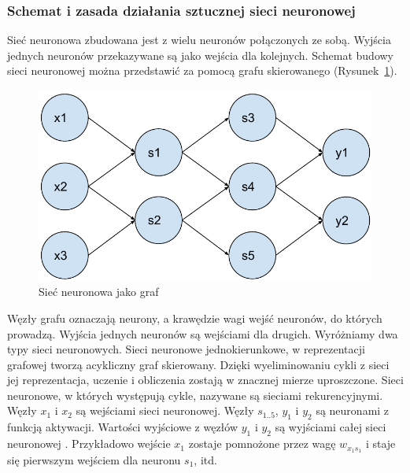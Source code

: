 \documentclass[a4paper,12pt,twoside,openany]{report}
\newcommand{\Rys}[1]{(Rysunek~\ref{#1})}
\begin{document}
\subsubsection{Schemat i zasada działania sztucznej sieci neuronowej}
Sieć neuronowa zbudowana jest z wielu neuronów połączonych ze sobą.
Wyjścia jednych neuronów przekazywane są jako wejścia dla kolejnych.
Schemat budowy sieci neuronowej można przedstawić za pomocą grafu skierowanego \Rys{rys:mlp:graf}.
\begin{figure}[h]
	\centering
	\includegraphics[width=\textwidth]{ann-graf}
	\caption{Sieć neuronowa jako graf}
	\label{rys:mlp:graf}
\end{figure}
Węzły grafu oznaczają neurony, a krawędzie wagi wejść neuronów, do których prowadzą.
Wyjścia jednych neuronów są wejściami dla drugich.
Wyróżniamy dwa typy sieci neuronowych.
Sieci neuronowe jednokierunkowe, w reprezentacji grafowej tworzą acykliczny graf skierowany.
Dzięki wyeliminowaniu cykli z sieci jej reprezentacja, uczenie i obliczenia zostają w znacznej mierze uproszczone. 
Sieci neuronowe, w których występują cykle, nazywane są sieciami rekurencyjnymi.
Węzły $x_1$ i $x_2$ są wejściami sieci neuronowej.
Węzły $s_{1..5}$, $y_1$ i $y_2$ są neuronami z funkcją aktywacji.
Wartości wyjściowe z węzłów $y_1$ i $y_2$ są wyjściami całej sieci neuronowej \cite{Gurgen2017}.
Przykładowo wejście $x_1$ zostaje pomnożone przez wagę $w_{x_1s_1}$ i staje się pierwszym wejściem dla neuronu $s_1$, itd.
\end{document}
